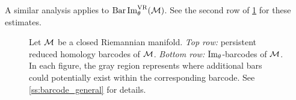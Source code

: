 A similar analysis applies to $\operatorname{Bar}\operatorname{Im}_\theta^{\mathrm{VR}}(\mathcal{M})$.
See the second row of \cref{fig:barcodes_general} for these estimates.

\begin{figure}
	\centering
	
	\caption{Let $\mathcal{M}$ be a closed Riemannian manifold.
    \emph{Top row:} persistent reduced homology barcodes of $\mathcal{M}$.
	\emph{Bottom row:} $\operatorname{Im}_\theta$-barcodes of $\mathcal{M}$.
    In each figure, the gray region represents where additional bars could potentially exist within the corresponding barcode.
    See \cref{ss:barcode_general} for details.}
	\label{fig:barcodes_general}
\end{figure}